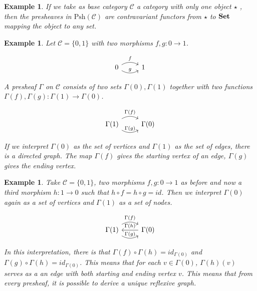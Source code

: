 \documentclass[12pt,a4paper,twoside,xetex]{book}
\newcommand{\keyword}[1]{\emph{#1}\index{#1}}
\newtheorem{example}[theorem]{Example}
\newcommand{\Psh}[1]{\text{Psh}\left(#1\right)}
\begin{document}
\begin{example}
If we take as base category $\mathcal{C}$ a category with only one object 
$\star$ , then the presheaves in $\Psh{\mathcal{C}}$ are contravariant functors 
from $\star$ to $\text{\textbf{Set}}$ mapping the object to any set. 

\end{example}

\begin{example}

Let $\mathcal{C} = \{0,1\}$ with two morphisms $f,g:0\rightarrow 1$. 

\[ \begin{tikzcd}
0 \arrow[r, bend left, "f"] \arrow[r, bend right, "g"] & 1
\end{tikzcd} \]


A presheaf $\Gamma$ on $\mathcal{C}$ consists of two sets $\Gamma (0), \Gamma 
(1)$ together with two functions $\Gamma (f),\Gamma (g):\Gamma (1) \rightarrow 
\Gamma (0)$.

\[ \begin{tikzcd}
\Gamma (1)
\arrow[r, bend left, "\Gamma (f)"] 
\arrow[r, bend right, "\Gamma (g)"] 
& \Gamma(0) 
\end{tikzcd} \]

 If we interpret $\Gamma (0)$ as the set of vertices and $\Gamma (1)$ as the 
set of edges, there is a directed graph. The map $\Gamma (f)$ gives the starting 
vertex of an edge, $\Gamma (g)$ gives the ending vertex. 
\end{example}

\begin{example} \label{reflgraph}
Take $\mathcal{C} = \{0,1\}$, two morphisms $f,g:0\rightarrow 1$ as before and 
now a third morphism $h: 1 \rightarrow 0$ such that $h \circ f = h \circ g = 
id$. Then we interpret $\Gamma (0)$ again as a set of vertices and $\Gamma (1)$ 
as a set of nodes.

\[ \begin{tikzcd}
\Gamma (1)
\arrow[r, bend left, "\Gamma (f)"] 
\arrow[r, bend right, "\Gamma (g)"] 
& \Gamma(0) 
\arrow[l, "\Gamma (h)"{above}]
\end{tikzcd} \]

In this interpretation, there is that $\Gamma (f) \circ \Gamma (h) = id_{\Gamma 
(0)}$ and $\Gamma (g) \circ \Gamma (h) = id_{\Gamma(0)}$. This means that for 
each $v \in \Gamma (0)$, $\Gamma (h) (v)$ serves as a an edge with both 
starting and ending vertex $v$. This means that from every presheaf, it is 
possible to derive a unique \keyword{reflexive graph}. 
\end{example}
\end{document}

